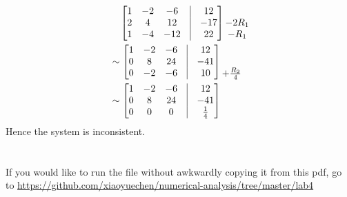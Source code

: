 \documentclass{article}
\begin{document}
\section{}
\begin{align*}
	 & \quad \begin{bmatrix}
		1 & -2 & -6  & \vline & 12  \\
		2 & 4  & 12  & \vline & -17 \\
		1 & -4 & -12 & \vline & 22
	\end{bmatrix}
	\begin{matrix}
		\\
		-2R_1 \\
		-R_1
	\end{matrix}          \\
	 & \sim \begin{bmatrix}
		1 & -2 & -6 & \vline & 12  \\
		0 & 8  & 24 & \vline & -41 \\
		0 & -2 & -6 & \vline & 10
	\end{bmatrix}
	\begin{matrix}
		\\
		\\
		+\frac{R_2}{4}
	\end{matrix}          \\
	 & \sim \begin{bmatrix}
		1 & -2 & -6 & \vline & 12          \\
		0 & 8  & 24 & \vline & -41         \\
		0 & 0  & 0  & \vline & \frac{1}{4}
	\end{bmatrix}
\end{align*}
Hence the system is inconsistent.

\section{}
If you would like to run the file without awkwardly copying it from this pdf,
go to \url{https://github.com/xiaoyuechen/numerical-analysis/tree/master/lab4}

\end{document}
